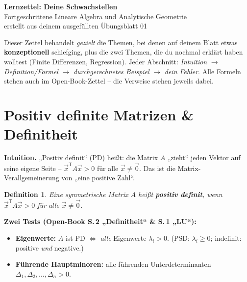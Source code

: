 \documentclass[a4paper,11pt]{article}
\newcommand{\transp}{^{\mathsf{T}}}
\theoremstyle{def0}
\newtheorem*{defn}{Definition}
\begin{document}
\color{fg}
\begingroup
\begin{center}
  {\color{accent}\LARGE\bfseries Lernzettel: Deine Schwachstellen}\\[0.3em]
  {\large Fortgeschrittene Lineare Algebra und Analytische Geometrie}\\[0.2em]
  {\small erstellt aus deinem ausgefüllten Übungsblatt 01}
\end{center}
\endgroup

\vspace{0.4em}{\color{rulecol}\hrule}\vspace{0.6em}

Dieser Zettel behandelt \emph{gezielt} die Themen, bei denen auf deinem Blatt etwas
\textbf{konzeptionell} schiefging, plus die zwei Themen, die du nochmal erklärt haben
wolltest (Finite Differenzen, Regression). Jeder Abschnitt: \emph{Intuition} $\to$
\emph{Definition/Formel} $\to$ \emph{durchgerechnetes Beispiel} $\to$ \emph{dein Fehler}.
Alle Formeln stehen auch im Open-Book-Zettel -- die Verweise stehen jeweils dabei.

\tableofcontents
\vspace{0.4em}{\color{rulecol}\hrule}

\section{Positiv definite Matrizen \& Definitheit}

\textbf{Intuition.} „Positiv definit“ (PD) heißt: die Matrix $A$ „zieht“ jeden Vektor
auf seine eigene Seite -- $\vec{x}\transp A\vec{x} > 0$ für alle $\vec{x}\ne\vec{0}$.
Das ist die Matrix-Verallgemeinerung von „eine positive Zahl“.

\begin{defn}
Eine \emph{symmetrische} Matrix $A$ heißt \textbf{positiv definit}, wenn
$\vec{x}\transp A\vec{x} > 0$ für alle $\vec{x}\ne\vec{0}$.
\end{defn}

\textbf{Zwei Tests (Open-Book S.\,2 „Definitheit“ \& S.\,1 „LU“):}
\begin{itemize}[noitemsep]
  \item \textbf{Eigenwerte:} $A$ ist PD $\iff$ \emph{alle} Eigenwerte $\lambda_i > 0$.
        (PSD: $\lambda_i\ge0$; indefinit: positive \emph{und} negative.)
  \item \textbf{Führende Hauptminoren:} alle führenden Unterdeterminanten
        $\Delta_1,\Delta_2,\dots,\Delta_n > 0$.
\end{itemize}
\end{document}
